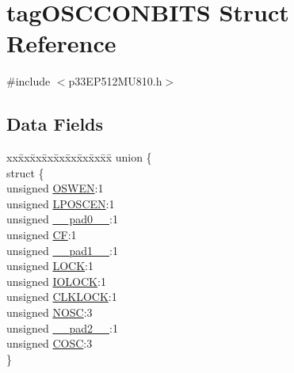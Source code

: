 \hypertarget{structtag_o_s_c_c_o_n_b_i_t_s}{}\section{tag\+O\+S\+C\+C\+O\+N\+B\+I\+TS Struct Reference}
\label{structtag_o_s_c_c_o_n_b_i_t_s}


{\ttfamily \#include $<$p33\+E\+P512\+M\+U810.\+h$>$}

\subsection*{Data Fields}
\begin{DoxyCompactItemize}
\item 
\begin{tabbing}
xx\=xx\=xx\=xx\=xx\=xx\=xx\=xx\=xx\=\kill
union \{\\
\>struct \{\\
\>\>unsigned \hyperlink{structtag_o_s_c_c_o_n_b_i_t_s_aa6599e29f403058e69b54fc40d98f38e}{OSWEN}:1\\
\>\>unsigned \hyperlink{structtag_o_s_c_c_o_n_b_i_t_s_adb797ad633d2596409875c2c864dcb6c}{LPOSCEN}:1\\
\>\>unsigned \hyperlink{structtag_o_s_c_c_o_n_b_i_t_s_adf71f3d8410c1f1dbbc96680a92c49af}{\_\_pad0\_\_}:1\\
\>\>unsigned \hyperlink{structtag_o_s_c_c_o_n_b_i_t_s_a435b0a197dff9c50dae041ff6654cfd9}{CF}:1\\
\>\>unsigned \hyperlink{structtag_o_s_c_c_o_n_b_i_t_s_acaf2d0924a107ec6e8d2e31febaf66f9}{\_\_pad1\_\_}:1\\
\>\>unsigned \hyperlink{structtag_o_s_c_c_o_n_b_i_t_s_ad3395d23fb03c1d5daf6d3b3300f8046}{LOCK}:1\\
\>\>unsigned \hyperlink{structtag_o_s_c_c_o_n_b_i_t_s_a77471f3ff595c8d8c0f3be6d83041660}{IOLOCK}:1\\
\>\>unsigned \hyperlink{structtag_o_s_c_c_o_n_b_i_t_s_a1f5663676347a211c4019b88332e7ad9}{CLKLOCK}:1\\
\>\>unsigned \hyperlink{structtag_o_s_c_c_o_n_b_i_t_s_a4b519e78e93d5a38339fbb59680c2334}{NOSC}:3\\
\>\>unsigned \hyperlink{structtag_o_s_c_c_o_n_b_i_t_s_a4d97cc5f7d51d22fc2bf3eab35c9cb7f}{\_\_pad2\_\_}:1\\
\>\>unsigned \hyperlink{structtag_o_s_c_c_o_n_b_i_t_s_abee647849ea2a20c1115594048b2631f}{COSC}:3\\
\>\} \\

\end{tabbing}
\end{DoxyCompactItemize}
